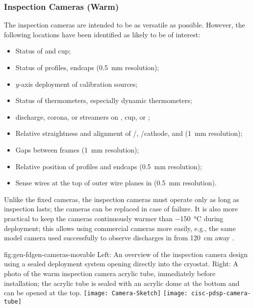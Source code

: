 \subsubsection{Inspection Cameras (Warm)}

The inspection cameras are intended to be as versatile as possible.
However, the following locations have been identified as likely
to be of interest:
\begin{itemize}
\item Status of  \fdth and cup;
\item Status of  profiles, endcaps (\SI{0.5}{mm} resolution);
\item $y$-axis deployment of calibration sources;
\item Status of thermometers, especially dynamic thermometers;
\item {} discharge, corona, or streamers on  \fdth, cup, or ;
\item Relative straightness and alignment of /, /cathode, and  (\SI{1}{mm} resolution);
\item Gaps between  frames (\SI{1}{mm} resolution);
\item Relative position of profiles and endcaps (\SI{0.5}{mm} resolution);
\item Sense wires at the top of outer wire planes in \single {} (\SI{0.5}{mm} resolution).
\end{itemize}

Unlike the fixed cameras, the inspection cameras must operate only as
long as inspection lasts; the cameras can be replaced in case of failure.  It
is also more practical to keep the cameras continuously warmer than
 \SI{-150}{\celsius} during deployment; this allows using %
commercial cameras more easily, e.g., %
the same model camera used successfully to observe discharges
in \lar from \SI{120}{cm} away \cite{Auger:2015xlo}.

\begin{dunefigure}{fig:gen-fdgen-cameras-movable}
  {Left: An overview of the inspection camera design using a sealed deployment system opening directly into the cryostat. Right: A photo of the  warm inspection camera acrylic tube, immediately before installation; the acrylic tube is sealed with an acrylic dome at the bottom and can be opened at the top.}
  \texttt{[image: Camera-Sketch]}%
  \texttt{[image: cisc-pdsp-camera-tube]}%
\end{dunefigure}

